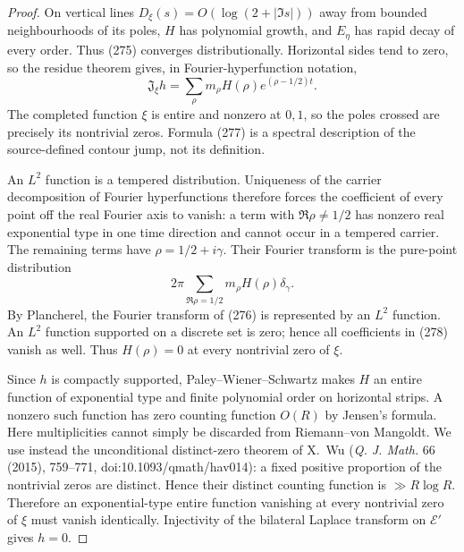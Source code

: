 \documentclass[11pt]{article}
\begin{document}
\begin{proof}
On vertical lines $D_\xi(s)=O(\log(2+|\Im s|))$ away from bounded
neighbourhoods of its poles, $H$ has polynomial growth, and $E_\eta$ has
rapid decay of every order.  Thus (275) converges distributionally.
Horizontal sides tend to zero, so the residue theorem gives, in
Fourier-hyperfunction notation,
\begin{equation}
 \mathfrak J_\xi h
 =\sum_{\rho}m_\rho H(\rho)
       e^{(\rho-1/2)t}.                               \tag{277}
\end{equation}
The completed function $\xi$ is entire and nonzero at $0,1$, so the poles
crossed are precisely its nontrivial zeros.  Formula (277) is a spectral description of the
source-defined contour jump, not its definition.

An $L^2$ function is a tempered distribution.  Uniqueness of the carrier
decomposition of Fourier hyperfunctions therefore forces the coefficient
of every point off the real Fourier axis to vanish: a term with
$\Re\rho\ne1/2$ has nonzero real exponential type in one time direction
and cannot occur in a tempered carrier.  The remaining terms have
$\rho=1/2+i\gamma$.  Their Fourier transform is the pure-point distribution
\begin{equation}
 2\pi\sum_{\Re\rho=1/2}m_\rho H(\rho)\delta_\gamma.   \tag{278}
\end{equation}
By Plancherel, the Fourier transform of (276) is represented by an $L^2$
function.  An $L^2$ function supported on a discrete set is zero; hence all
coefficients in (278) vanish as well.  Thus $H(\rho)=0$ at every nontrivial
zero of $\xi$.

Since $h$ is compactly supported, Paley--Wiener--Schwartz makes $H$ an
entire function of exponential type and finite polynomial order on
horizontal strips.  A nonzero such function has zero counting function
$O(R)$ by Jensen's formula.  Here multiplicities cannot simply be discarded
from Riemann--von Mangoldt.  We use instead the unconditional distinct-zero
theorem of X.~Wu (\emph{Q. J. Math.} 66 (2015), 759--771,
doi:10.1093/qmath/hav014): a fixed positive proportion of the nontrivial
zeros are distinct.  Hence their distinct counting function is
$\gg R\log R$.  Therefore an exponential-type entire function vanishing at
every nontrivial zero of $\xi$ must vanish identically.  Injectivity of the
bilateral Laplace transform on $\mathcal E'$ gives $h=0$.
\end{proof}
\end{document}
